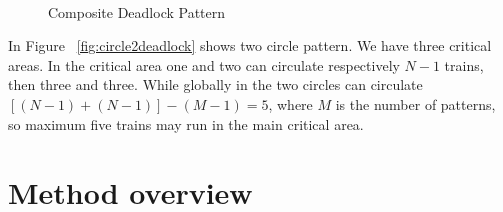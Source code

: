 \documentclass{ewic}
\begin{document}
			\begin{figure}[!htp]
			 \centering
			
			 
			 \\
			
			\caption{Composite Deadlock Pattern}
			 \label{fig:compdeadlockpattern}
			 \end{figure}
			
			
			In Figure ~\ref{fig:circle2deadlock} shows two circle pattern. We have three critical areas. In the critical area one and two can circulate respectively $N-1$ trains, then three and three. While globally in the two circles can circulate $[(N-1) + (N-1)] - (M-1)=5$, where $M$ is the number of patterns, so maximum five trains may run in the main critical area.
			
			\section{Method overview}
			
			
\end{document}
